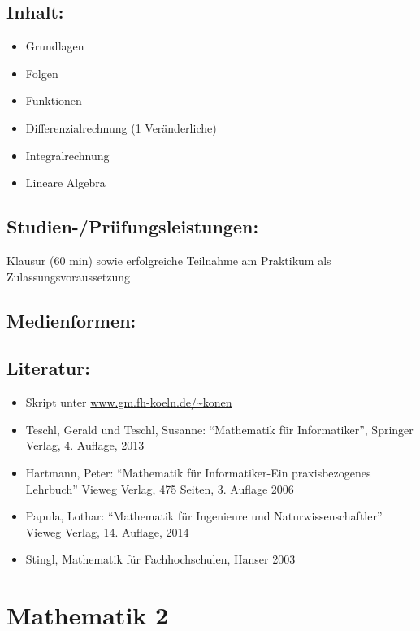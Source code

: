 \section{Inhalt:}\label{inhalt-13}

\begin{itemize}
\tightlist
\item
  Grundlagen
\item
  Folgen
\item
  Funktionen
\item
  Differenzialrechnung (1 Veränderliche)
\item
  Integralrechnung
\item
  Lineare Algebra
\end{itemize}

\section{Studien-/Prüfungsleistungen:}\label{studien-pruxfcfungsleistungen-13}

Klausur (60 min) sowie erfolgreiche Teilnahme am Praktikum als
Zulassungsvoraussetzung

\section{Medienformen:}\label{medienformen-13}

\section{Literatur:}\label{literatur-13}

\begin{itemize}
\tightlist
\item
  Skript unter \url{www.gm.fh-koeln.de/~konen}
\item
  Teschl, Gerald und Teschl, Susanne: ``Mathematik für Informatiker'',
  Springer Verlag, 4. Auflage, 2013
\item
  Hartmann, Peter: ``Mathematik für Informatiker-Ein praxisbezogenes
  Lehrbuch'' Vieweg Verlag, 475 Seiten, 3. Auflage 2006
\item
  Papula, Lothar: ``Mathematik für Ingenieure und Naturwissenschaftler''
  Vieweg Verlag, 14. Auflage, 2014
\item
  Stingl, Mathematik für Fachhochschulen, Hanser 2003
\end{itemize}

\chapter{Mathematik 2}\label{mathematik-2}

